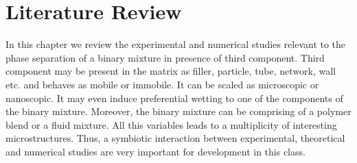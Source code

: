 \documentclass[12pt]{iiscthes}
\theoremstyle{definition}
\theoremstyle{definition}
\theoremstyle{remark}
\begin{document}
\chapter{Literature Review}
In this chapter we review the experimental and numerical studies relevant to the phase separation of a binary mixture 
in presence of third component. Third component may be present in the matrix as filler, particle, tube, network, wall etc. and behaves as mobile or immobile. It can be scaled as microscopic or nanoscopic. It may even induce preferential wetting to one of the components of the binary mixture. Moreover, the binary mixture can be comprising of a polymer blend or a fluid mixture. All this variables leads to a multiplicity of interesting microstructures. Thus, a symbiotic interaction between experimental, theoretical and numerical studies are very important for development in this class.
\end{document}
